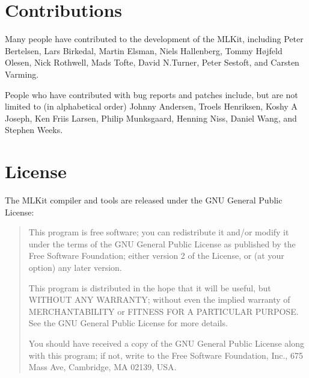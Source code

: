\documentclass[12pt]{book}
\begin{document}
\newpage

\section*{Contributions}
Many people have contributed to the development of the MLKit, including Peter
Bertelsen, Lars Birkedal, Martin Elsman, Niels Hallenberg, Tommy H\o jfeld
Olesen, Nick Rothwell, Mads Tofte, David N.\@ Turner, Peter Sestoft, and Carsten
Varming.

People who have contributed with bug reports and patches include, but are not
limited to (in alphabetical order) Johnny Andersen, Troels Henriksen, Koshy A
Joseph, Ken Friis Larsen, Philip Munksgaard, Henning Niss, Daniel Wang, and
Stephen Weeks.

\section*{License}
The MLKit compiler and tools are released under the GNU General Public License:

{\sc
\begin{quote}
  This program is free software; you can redistribute it and/or
  modify it under the terms of the GNU General Public License as
  published by the Free Software Foundation; either version 2 of the
  License, or (at your option) any later version.

  This program is distributed in the hope that it will be useful, but
  WITHOUT ANY WARRANTY; without even the implied warranty of
  MERCHANTABILITY or FITNESS FOR A PARTICULAR PURPOSE.  See the GNU
  General Public License for more details.

  You should have received a copy of the GNU General Public License
  along with this program; if not, write to the Free Software
  Foundation, Inc., 675 Mass Ave, Cambridge, MA 02139, USA.
\end{quote}
}
\end{document}
